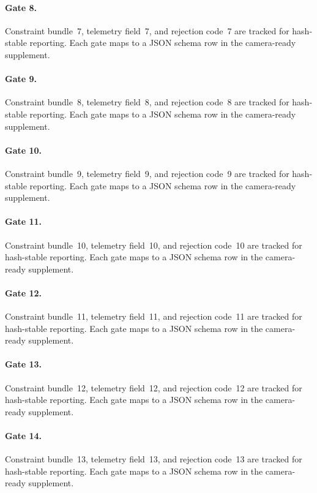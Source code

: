 \documentclass[sigconf,nonacm]{acmart}
\begin{document}
\paragraph{Gate 8.}
Constraint bundle~7, telemetry field~7, and rejection code~7 are tracked for hash-stable reporting. Each gate maps to a JSON schema row in the camera-ready supplement. %

\paragraph{Gate 9.}
Constraint bundle~8, telemetry field~8, and rejection code~8 are tracked for hash-stable reporting. Each gate maps to a JSON schema row in the camera-ready supplement. %

\paragraph{Gate 10.}
Constraint bundle~9, telemetry field~9, and rejection code~9 are tracked for hash-stable reporting. Each gate maps to a JSON schema row in the camera-ready supplement. %

\paragraph{Gate 11.}
Constraint bundle~10, telemetry field~10, and rejection code~10 are tracked for hash-stable reporting. Each gate maps to a JSON schema row in the camera-ready supplement. %

\paragraph{Gate 12.}
Constraint bundle~11, telemetry field~11, and rejection code~11 are tracked for hash-stable reporting. Each gate maps to a JSON schema row in the camera-ready supplement. %

\paragraph{Gate 13.}
Constraint bundle~12, telemetry field~12, and rejection code~12 are tracked for hash-stable reporting. Each gate maps to a JSON schema row in the camera-ready supplement. %

\paragraph{Gate 14.}
Constraint bundle~13, telemetry field~13, and rejection code~13 are tracked for hash-stable reporting. Each gate maps to a JSON schema row in the camera-ready supplement. %
\end{document}
